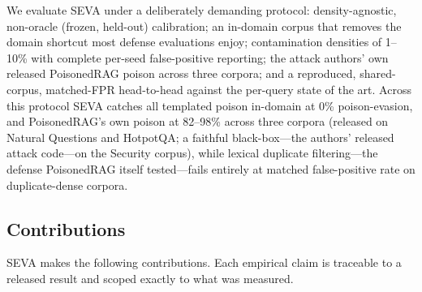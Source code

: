 \documentclass[conference]{IEEEtran}
\begin{document}
We evaluate SEVA under a deliberately demanding protocol: density-agnostic,
non-oracle (frozen, held-out) calibration; an in-domain corpus that removes the
domain shortcut most defense evaluations enjoy; contamination densities of
1--10\% with complete per-seed false-positive reporting; the attack authors' own
released PoisonedRAG poison across three corpora; and a reproduced,
shared-corpus, matched-FPR head-to-head against the per-query state of the
art.
Across this protocol SEVA catches all templated poison in-domain at 0\% poison-evasion,
and PoisonedRAG's own poison at 82--98\% across three corpora (released on Natural
Questions and HotpotQA; a faithful black-box---the authors' released attack code---on
the Security corpus), while lexical
duplicate filtering---the defense PoisonedRAG itself tested---fails entirely at
matched false-positive rate on duplicate-dense corpora.

\subsection{Contributions}
SEVA makes the following contributions. Each empirical claim is traceable to a
released result and scoped exactly to what was measured.
\end{document}
